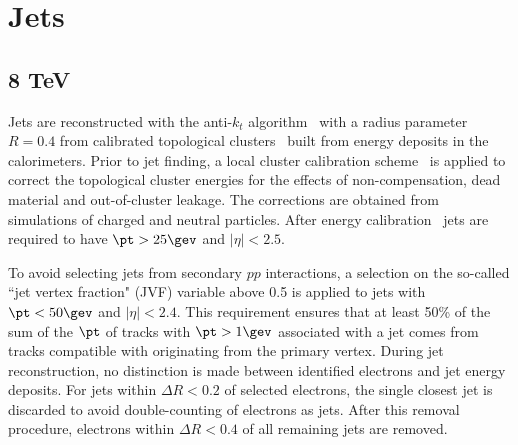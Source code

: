 

\section{Jets}
\label{sec:jetObjectDef}
\subsection{8 TeV}
\label{sec:jetObjectDef8TeV}
Jets are reconstructed with the anti-$k_t$ algorithm~\cite{ref:Cacciari2008,ref:Cacciari2006,ref:fastjet} with a radius parameter $R=0.4$ from calibrated topological clusters~\cite{ATLASTechnicalPaper} built from energy deposits in the calorimeters.  Prior to jet finding, a local cluster calibration scheme~\cite{LCW1,LCW2} is applied to correct the topological cluster energies for the effects of non-compensation, dead material and out-of-cluster leakage. The corrections are obtained from simulations
of charged and neutral particles.  After energy calibration~\cite{ATLASJetEnergyMeasurement} jets are required to have $\pt > 25\gev$ and $|\eta| < 2.5$.

To avoid selecting jets from secondary $pp$ interactions, a selection on the so-called ``jet vertex fraction" (JVF) variable above 0.5 is applied to jets with $\pt <50\gev$ and $|\eta|<2.4$. This requirement ensures that at least 50\% of the sum of the $\pt$ of tracks with $\pt>1\gev$ associated with a jet comes from tracks compatible
with originating from the primary vertex. During jet reconstruction, no distinction is made between identified electrons and jet energy deposits.  For jets within $\Delta R < 0.2$ of selected electrons, the single closest jet is discarded to avoid double-counting of electrons as jets.  After this removal procedure, electrons within $\Delta R < 0.4$ of all remaining jets are removed.

